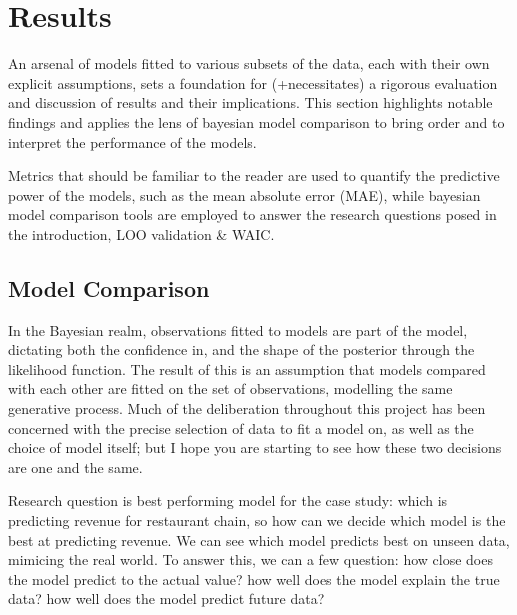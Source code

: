 \section{Results}

An arsenal of models fitted to various subsets of the data, each with their own
explicit assumptions, sets a foundation for (+necessitates) a rigorous evaluation
and discussion of results and their implications. This section highlights notable
findings and applies the lens of bayesian model comparison to bring order and 
to interpret the performance of the models. 

Metrics that should be familiar to the reader are used to quantify the predictive
power of the models, such as the mean absolute error (MAE), while bayesian model 
comparison tools are employed to answer the research questions posed in the 
introduction, LOO validation \& WAIC.

\subsection{Model Comparison}

In the Bayesian realm, observations fitted to models are part of the model,
dictating both the confidence in, and the shape of the posterior through the
likelihood function. The result of this is an assumption that models compared
with each other are fitted on the set of observations, modelling the same 
generative process. Much of the deliberation throughout this project has been 
concerned with the precise selection of data to fit a model on, as well as 
the choice of model itself; but I hope you are starting to see how these two
decisions are one and the same.

Research question is best performing model for the case study: which is predicting revenue
for restaurant chain, so how can we decide which model is the best at predicting revenue. 
We can see which model predicts best on unseen data, mimicing the real world. 
To answer this, we can a few question: how close does the model predict to the actual value?
how well does the model explain the true data? how well does the model predict future data?

